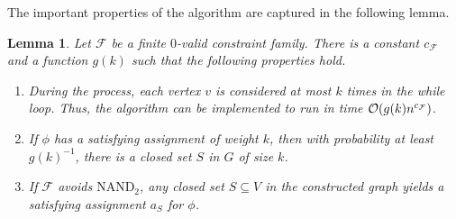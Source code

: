 \documentclass[10pt,a4paper]{article}
\theoremstyle{plain}
\newtheorem{lem}[thm]{Lemma}
\newcommand{\Oh}{{\cal O}}
\newcommand{\NAND}{\mathrm{NAND}}
\newcommand{\confam}{\mathcal{F}}
\begin{document}
%
The important properties of the algorithm are captured in the following lemma.
\begin{lem}\label{lem:randprop}
Let $\confam$ be a finite $0$-valid constraint family. There is a constant $c_\confam$ and a function $g(k)$ such that the following properties hold.
\begin{enumerate}[label=(P\arabic*)]
\item\label{item:iters} During the process, each vertex $v$ is considered at most $k$ times in the while loop. Thus, the algorithm can be implemented to run in time $\Oh(g(k)n^{c_\confam})$.
\item\label{item:satisclosedwhp} If $\phi$ has a satisfying assignment of weight $k$, then with probability at least $g(k)^{-1}$, there is a closed set $S$ in $G$ of size $k$.
\item\label{item:closedissat} If $\confam$ avoids $\NAND_2$, any closed set $S\subseteq V$ in the constructed graph yields a satisfying assignment $a_S$ for $\phi$. 
\end{enumerate}
\end{lem}
\end{document}
